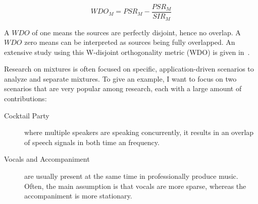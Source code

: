 \begin{equation}
    WDO_{M} = PSR_{M} - \frac{PSR_{M}}{SIR_{M}}
\end{equation}


A \(WDO\) of one means the sources are perfectly disjoint, hence no overlap.
A \(WDO\) zero means can be interpreted as sources being fully overlapped.
An extensive study using this W-disjoint orthogonality metric (WDO) is given in~\cite{rickard02}.
\par
Research on mixtures is often focused on specific, application-driven scenarios to analyze and separate mixtures.
To give an example, I want to focus on two scenarios that are very popular among research, each with a large amount of contributions:

\begin{description}
  \item[Cocktail Party] where multiple speakers are speaking concurrently, it results in an overlap of speech signals in both time an frequency. 
  \item[Vocals and Accompaniment] are usually present at the same time in professionally produce music. 
  Often, the main assumption is that vocals are more sparse, whereas the accompaniment is more stationary.
\end{description}

